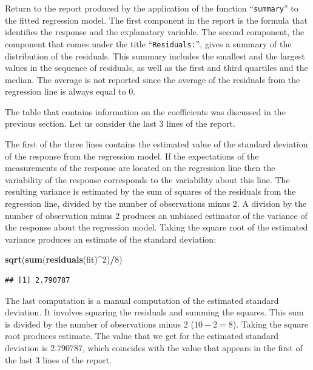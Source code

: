 \documentclass[
]{krantz}
\makeatletter
\newenvironment{Shaded}{\begin{snugshade}}{\end{snugshade}}
\newcommand{\DecValTok}[1]{\textcolor[rgb]{0.00,0.00,0.81}{#1}}
\newcommand{\KeywordTok}[1]{\textcolor[rgb]{0.13,0.29,0.53}{\textbf{#1}}}
\newcommand{\NormalTok}[1]{#1}
\newcommand{\OperatorTok}[1]{\textcolor[rgb]{0.81,0.36,0.00}{\textbf{#1}}}
\newenvironment{kframe}{%
\medskip{}
\setlength{\fboxsep}{.8em}
 \def\at@end@of@kframe{}%
 \ifinner\ifhmode%
  \def\at@end@of@kframe{\end{minipage}}%
  \begin{minipage}{\columnwidth}%
 \fi\fi%
 \def\FrameCommand##1{\hskip\@totalleftmargin \hskip-\fboxsep
 \colorbox{shadecolor}{##1}\hskip-\fboxsep
     \hskip-\linewidth \hskip-\@totalleftmargin \hskip\columnwidth}%
 \MakeFramed {\advance\hsize-\width
   \@totalleftmargin\z@ \linewidth\hsize
   \@setminipage}}%
 {\par\unskip\endMakeFramed%
 \at@end@of@kframe}
\renewenvironment{Shaded}{\begin{kframe}}{\end{kframe}}
\theoremstyle{definition}
\theoremstyle{definition}
\theoremstyle{definition}
\theoremstyle{remark}
\makeatother
\begin{document}
Return to the report produced by the application of the function
``\texttt{summary}'' to the fitted regression model. The first component in the
report is the formula that identifies the response and the explanatory
variable. The second component, the component that comes under the title
``\texttt{Residuals:}'', gives a summary of the distribution of the residuals.
This summary includes the smallest and the largest values in the
sequence of residuals, as well as the first and third quartiles and the
median. The average is not reported since the average of the residuals
from the regression line is always equal to 0.

The table that contains information on the coefficients was discussed in
the previous section. Let us consider the last 3 lines of the report.

The first of the three lines contains the estimated value of the
standard deviation of the response from the regression model. If the
expectations of the measurements of the response are located on the
regression line then the variability of the response corresponds to the
variability about this line. The resulting variance is estimated by the
sum of squares of the residuals from the regression line, divided by the
number of observations minus 2. A division by the number of observation
minus 2 produces an unbiased estimator of the variance of the response
about the regression model. Taking the square root of the estimated
variance produces an estimate of the standard deviation:

\begin{Shaded}
\begin{Highlighting}[]
\KeywordTok{sqrt}\NormalTok{(}\KeywordTok{sum}\NormalTok{(}\KeywordTok{residuals}\NormalTok{(fit)}\OperatorTok{^}\DecValTok{2}\NormalTok{)}\OperatorTok{/}\DecValTok{8}\NormalTok{)}
\end{Highlighting}
\end{Shaded}

\begin{verbatim}
## [1] 2.790787
\end{verbatim}

The last computation is a manual computation of the estimated standard
deviation. It involves squaring the residuals and summing the squares.
This sum is divided by the number of observations minus 2 (\(10-2=8\)).
Taking the square root produces estimate. The value that we get for the
estimated standard deviation is 2.790787, which coincides with the value
that appears in the first of the last 3 lines of the report.
\end{document}
